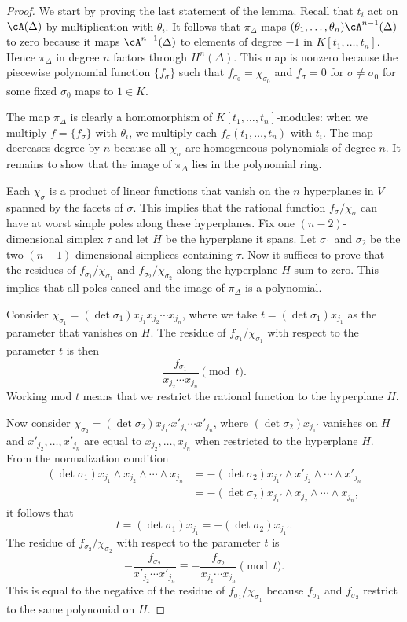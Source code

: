 \begin{proof}
We start by proving the last statement of the lemma. Recall that $t_i$ act on $\cA(\Delta)$ by multiplication with $\theta_i$. It follows that $\pi_{\Delta}$ maps $(\theta_1,\ldots,\theta_n) \cA^{n-1}(\Delta)$ to zero because it maps $\cA^{n-1}(\Delta)$ to elements of degree $-1$ in $K[t_1,\ldots, t_n]$. Hence $\pi_{\Delta}$ in degree $n$ factors through $H^n(\Delta)$. This map is nonzero because the piecewise polynomial function $\{ f_\sigma\}$ such that $f_{\sigma_0} = \chi_{\sigma_0}$ and $f_\sigma=0$ for $\sigma\neq \sigma_0$ for some fixed $\sigma_0$ maps to $1\in K$.

The map $\pi_{\Delta}$ is clearly a homomorphism of $K[t_1,\ldots, t_n]$-modules: when we multiply $f= \{f_\sigma \}$ with $\theta_i$, we multiply each $f_\sigma(t_1,\ldots,t_n)$ with $t_i$. The map decreases degree by $n$ because all $\chi_\sigma$ are homogeneous polynomials of degree $n$. It remains to show that the image of $\pi_{\Delta}$ lies in the polynomial ring.

Each $\chi_\sigma$ is a product of linear functions that vanish on the $n$ hyperplanes in $V$ spanned by the facets of $\sigma$. This implies that the rational function $f_\sigma/\chi_\sigma$ can have at worst simple poles along these hyperplanes. Fix one $(n-2)$-dimensional simplex $\tau$ and let $H$ be the hyperplane it spans. Let $\sigma_1$ and $\sigma_2$ be the two $(n-1)$-dimensional simplices containing $\tau$. Now it suffices to prove that the residues of  $f_{\sigma_1}/\chi_{\sigma_1}$ and $f_{\sigma_2}/\chi_{\sigma_2}$ along the hyperplane $H$ sum to zero. This implies that all poles cancel and the image of $\pi_{\Delta}$ is a polynomial.

Consider $\chi_{\sigma_1} =  (\det \sigma_1) x_{j_1} x_{j_2} \cdots x_{j_n}$, where we take $t=(\det \sigma_1) x_{j_1}$ as the parameter that vanishes on $H$. The residue of $f_{\sigma_1}/\chi_{\sigma_1}$ with respect to the parameter $t$ is then 
\[ \frac{f_{\sigma_1}}{x_{j_2} \cdots x_{j_n}} \pmod t.\]
Working mod $t$ means that we restrict the rational function to the hyperplane $H$.

Now consider $\chi_{\sigma_2} = (\det \sigma_2) x_{j_1'} x'_{j_2} \cdots x'_{j_n}$, where $(\det \sigma_2) x_{j_1'}$ vanishes on $H$ and $x'_{j_2}, \ldots, x'_{j_n}$ are equal to $x_{j_2}, \ldots, x_{j_n}$ when restricted to the hyperplane $H$. From the normalization condition
\begin{align*}
  (\det \sigma_1) x_{j_1}\wedge x_{j_2} \wedge \cdots \wedge x_{j_n} &= -(\det \sigma_2) x_{j_1'}\wedge x'_{j_2} \wedge \cdots \wedge x'_{j_n} \\
    &= -(\det \sigma_2) x_{j_1'}\wedge x_{j_2} \wedge \cdots \wedge x_{j_n},
\end{align*}
it follows that 
\[ t= (\det \sigma_1) x_{j_1} = - (\det \sigma_2) x_{j_1'}.\]
The residue of $f_{\sigma_2}/\chi_{\sigma_2}$ with respect to the parameter $t$ is
\[ -\frac{f_{\sigma_2}}{x'_{j_2} \cdots x'_{j_n}} \equiv - \frac{f_{\sigma_2}}{x_{j_2} \cdots x_{j_n}} \pmod t.\]
This is equal to the negative of the residue of $f_{\sigma_1}/\chi_{\sigma_1}$ because $f_{\sigma_1}$ and $f_{\sigma_2}$ restrict to the same polynomial on $H$.
\end{proof}
